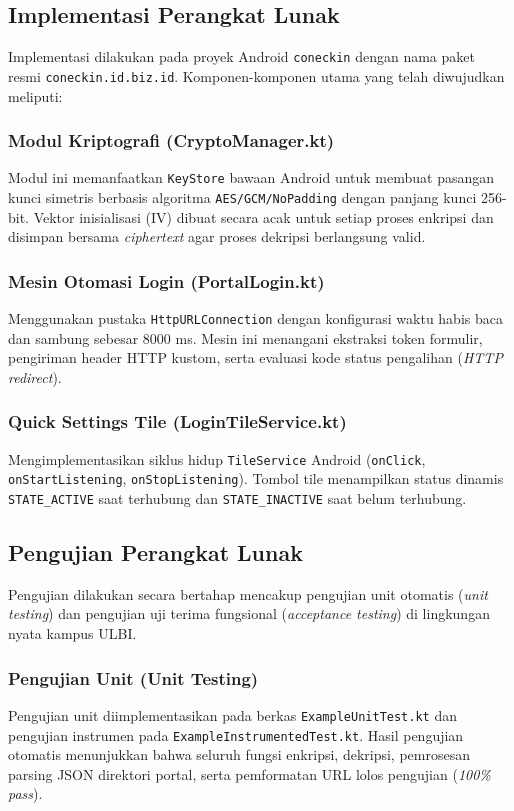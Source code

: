 \subsection{Implementasi Perangkat Lunak}
Implementasi dilakukan pada proyek Android \texttt{coneckin} dengan nama paket resmi \texttt{coneckin.id.biz.id}. Komponen-komponen utama yang telah diwujudkan meliputi:

\subsubsection{Modul Kriptografi (CryptoManager.kt)}
Modul ini memanfaatkan \texttt{KeyStore} bawaan Android untuk membuat pasangan kunci simetris berbasis algoritma \texttt{AES/GCM/NoPadding} dengan panjang kunci 256-bit. Vektor inisialisasi (IV) dibuat secara acak untuk setiap proses enkripsi dan disimpan bersama \textit{ciphertext} agar proses dekripsi berlangsung valid.

\subsubsection{Mesin Otomasi Login (PortalLogin.kt)}
Menggunakan pustaka \texttt{HttpURLConnection} dengan konfigurasi waktu habis baca dan sambung sebesar 8000 ms. Mesin ini menangani ekstraksi token formulir, pengiriman header HTTP kustom, serta evaluasi kode status pengalihan (\textit{HTTP redirect}).

\subsubsection{Quick Settings Tile (LoginTileService.kt)}
Mengimplementasikan siklus hidup \texttt{TileService} Android (\texttt{onClick}, \texttt{onStartListening}, \texttt{onStopListening}). Tombol tile menampilkan status dinamis \texttt{STATE\_ACTIVE} saat terhubung dan \texttt{STATE\_INACTIVE} saat belum terhubung.

\subsection{Pengujian Perangkat Lunak}
Pengujian dilakukan secara bertahap mencakup pengujian unit otomatis (\textit{unit testing}) dan pengujian uji terima fungsional (\textit{acceptance testing}) di lingkungan nyata kampus ULBI.

\subsubsection{Pengujian Unit (Unit Testing)}
Pengujian unit diimplementasikan pada berkas \texttt{ExampleUnitTest.kt} dan pengujian instrumen pada \texttt{ExampleInstrumentedTest.kt}. Hasil pengujian otomatis menunjukkan bahwa seluruh fungsi enkripsi, dekripsi, pemrosesan parsing JSON direktori portal, serta pemformatan URL lolos pengujian (\textit{100\% pass}).


